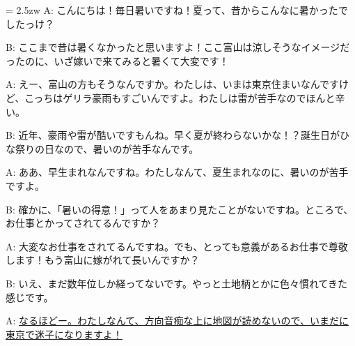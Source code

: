 \documentclass[11pt]{amsart}
\title{}
\author{}
\newenvironment{hangall}[1]{\hangindent = 2.5zw\everypar{\hangindent = 2.5zw}}{}
\begin{document}
\maketitle
\begin{hangall}{}%
A: こんにちは！毎日暑いですね！夏って、昔からこんなに暑かったでしたっけ？

B: ここまで昔は暑くなかったと思いますよ！ここ富山は涼しそうなイメージだったのに、いざ嫁いで来てみると暑くて大変です！

A: えー、富山の方もそうなんですか。わたしは、いまは東京住まいなんですけど、こっちはゲリラ豪雨もすごいんですよ。わたしは雷が苦手なのでほんと辛い。

B: 近年、豪雨や雷が酷いですもんね。早く夏が終わらないかな！？誕生日がひな祭りの日なので、暑いのが苦手なんです。

A: ああ、早生まれなんですね。わたしなんて、夏生まれなのに、暑いのが苦手ですよ。

B: 確かに、「暑いの得意！」って人をあまり見たことがないですね。ところで、お仕事とかってされてるんですか？

A: 大変なお仕事をされてるんですね。でも、とっても意義があるお仕事で尊敬します！もう富山に嫁がれて長いんですか？

B: いえ、まだ数年位しか経ってないです。やっと土地柄とかに色々慣れてきた感じです。

A: \ul{なるほどー。わたしなんて、方向音痴な上に地図が読めないので、いまだに東京で迷子になりますよ！}\end{hangall}
\end{document}
